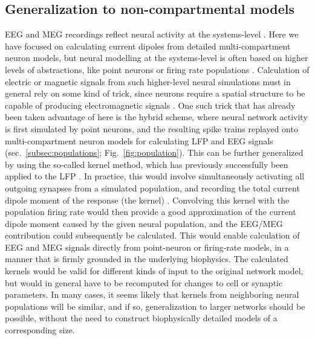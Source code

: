 \documentclass[preprint,10pt,authoryear]{elsarticle}
\newcommand{\hlg}[2][Emerald]{ {\sethlcolor{#1} \hl{#2}} }
\newcommand{\tvnnote}[1]{\color{white}{\hlg{TVN: #1 }}\color{black}}
\begin{document}
\subsection{Generalization to non-compartmental models}
EEG and MEG recordings reflect neural activity at the systems-level \citep{Pesaran2018, EINEVOLL2019}. Here we have focused on calculating current dipoles from detailed multi-compartment neuron models, but neural modelling at the systems-level is often based on higher levels of abstractions, like point neurons \citep{NEST} or firing rate populations \citep{TVB}.
Calculation of electric or magnetic signals from such higher-level neural simulations must in general rely on some kind of trick, since neurons require a spatial structure to be capable of producing electromagnetic signals \citep{EINEVOLL2013REVIEW}.
One such trick that has already been taken advantage of here is the hybrid scheme, where neural network activity is first simulated by point neurons, and the resulting spike trains replayed onto multi-compartment neuron models for calculating LFP and EEG signals (sec.~\ref{subsec:populations}; Fig.~\ref{fig:population}). This can be further generalized by using the so-called kernel method, which has previously successfully been applied to the LFP \citep{HAGEN2016, Skaar2020, Telenczuk2020}. In practice, this would involve simultaneously activating all outgoing synapses from a simulated population, and recording the total current dipole moment of the response (the kernel) \citep{HAGEN2016}. Convolving this kernel with the population firing rate would then provide a good approximation of the current dipole moment caused by the given neural population, and the EEG/MEG contribution could subsequently be calculated.
This would enable calculation of EEG and MEG signals directly from point-neuron or firing-rate models, in a manner that is firmly grounded in the underlying biophysics. 
The calculated kernels would be valid for different kinds of input to the original network model, but would in general have to be recomputed for changes to cell or synaptic parameters. 
In many cases, it seems likely that kernels from neighboring neural populations will be similar, and if so, generalization to larger networks should be possible, without the need to construct biophysically detailed models of a corresponding size.
\tvnnote{Bør vi gå dypere inn i dette?}
\end{document}
